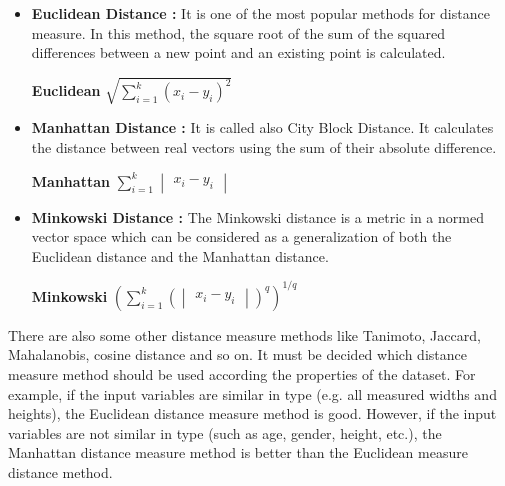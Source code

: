 \begin{itemize}

\item \textbf{Euclidean Distance : }It is one of the most popular methods for distance measure. In this method, the square root of the sum of the squared differences between a new point and an existing point is calculated.

  \begin{center}
  
\textbf{Euclidean} $ \sqrt{\sum_{i=1}^k  (x_{i} - y_{i})^2 } $

  \end{center}
  


\item \textbf{Manhattan Distance : }It is called also City Block Distance. It calculates the distance between real vectors using the sum of their absolute difference.

  \begin{center}
  
\textbf{Manhattan} $\sum_{i=1}^k \begin{vmatrix}x_{i} - y_{i} \end{vmatrix}$

  \end{center}
  

\item \textbf{Minkowski Distance : }The Minkowski distance is a metric in a normed vector space which can be considered as a generalization of both the Euclidean distance and the Manhattan distance.
  
  \begin{center}
  
\textbf{Minkowski} $ (\sum_{i=1}^k (\begin{vmatrix}x_{i} - y_{i} \end{vmatrix})^q)^{1/q}$

  \end{center}

\end{itemize}

There are also some other distance measure methods like Tanimoto, Jaccard, Mahalanobis, cosine distance and so on. It must be decided which distance measure method should be used according the properties of the dataset. For example, if the input variables are similar in type (e.g. all measured widths and heights), the Euclidean distance measure method is good. However, if the input variables are not similar in type (such as age, gender, height, etc.), the Manhattan distance measure method is better than the Euclidean measure distance method.



